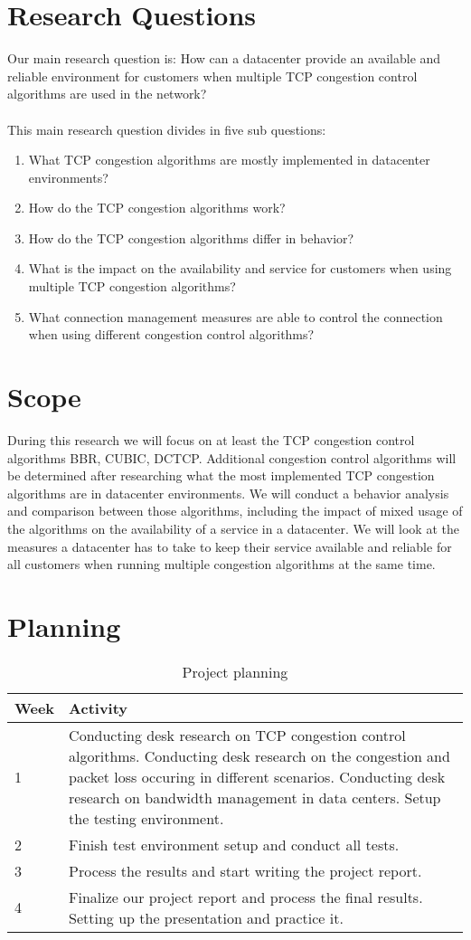 \documentclass{article}
\begin{document}
\section{Research Questions}
Our main research question is: How can a datacenter provide an available and reliable environment for customers when multiple TCP congestion control algorithms are used in the network?
\\ \\
This main research question divides in five sub questions:
\begin{enumerate}
\item What TCP congestion algorithms are mostly implemented in datacenter environments?
\item How do the TCP congestion algorithms work?
\item How do the TCP congestion algorithms differ in behavior?
\item What is the impact on the availability and service for customers when using multiple TCP congestion algorithms?
\item What connection management measures are able to control the connection when using different congestion control algorithms?
\end{enumerate}

\section{Scope}
During this research we will focus on at least the TCP congestion control algorithms BBR, CUBIC, DCTCP. Additional congestion control algorithms will be determined after researching what the most implemented TCP congestion algorithms are in datacenter environments. We will conduct a behavior analysis and comparison between those algorithms, including the impact of mixed usage of the algorithms on the availability of a service in a datacenter. We will look at the measures a datacenter has to take to keep their service available and reliable for all customers when running multiple congestion algorithms at the same time.

\section{Planning}
\begin{table}[H]
\centering
\label{my-label}
\begin{tabular}{l|p{8cm}}
\textbf{Week} & \textbf{Activity} \\ \hline
1    & Conducting desk research on TCP congestion control algorithms. Conducting desk research on the congestion and packet loss occuring in different scenarios. Conducting desk research on bandwidth management in data centers. Setup the testing environment. \\
2    & Finish test environment setup and conduct all tests.\\
3    & Process the results and start writing the project report.        \\
4    & Finalize our project report and process the final results. Setting up the presentation and practice it.       
\end{tabular}
\caption{Project planning}
\end{table}
\end{document}
